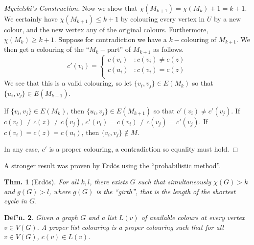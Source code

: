 \documentclass[12pt, a4paper]{book}
\newtheorem{theorem}{Thm.}[section]
\newtheorem{definition}[theorem]{Def'n.}
\theoremstyle{nonumberplain}
\newtheorem{proof}{Proof}
\begin{document}
\begin{proof}[Mycielski's Construction]
    Now we show that $\chi(M_{k+1})=\chi(M_k)+1=k+1$.
    We certainly have $\chi(M_{k+1})\leq k+1$ by colouring every vertex in $U$ by a new colour, and the new vertex any of the original colours.
    Furthermore, $\chi(M_k)\geq k+1$.
    Suppose for contradiction we have a $k-$colouring of $M_{k+1}$.
    We then get a colouring of the ``$M_k-$part'' of $M_{k+1}$ as follows.
    \[c'(v_i) =
        \begin{cases}
            c(v_i)&:c(v_i)\neq c(z)\\
            c(u_i)&:c(v_i)= c(z)\\
        \end{cases}
    \]
    We see that this is a valid colouring, so let $\{v_i,v_j\}\in E(M_k)$ so that $\{u_i,v_j\}\in E(M_{k+1})$.

    If $\{v_i,v_j\}\in E(M_k)$, then $\{u_i,v_j\}\in E(M_{k+1})$ so that $c'(v_i)\neq c'(v_j)$.
    If $c(v_i)\neq c(z)\neq c(v_j)$, $c'(v_i)=c(v_i)\neq c(v_j)=c'(v_j)$.
    If $c(v_i)=c(z)=c(u_i)$, then $\{v_i,v_j\}\notin M$.

    In any case, $c'$ is a proper colouring, a contradiction so equality must hold.
\end{proof}
A stronger result was proven by Erd\"os using the ``probabilistic method''.
\begin{theorem}[Erd\"os]
    For all $k,l$, there exists $G$ such that simultaneously $\chi(G)>k$ and $g(G)>l$, where $g(G)$ is the ``girth'', that is the length of the shortest cycle in $G$.
\end{theorem}
\begin{definition}
    Given a graph $G$ and a list $L(v)$ of available colours at every vertex $v\in V(G)$.
    A proper list colouring is a proper colouring such that for all $v\in V(G)$, $c(v)\in L(v)$.
\end{definition}
\end{document}
